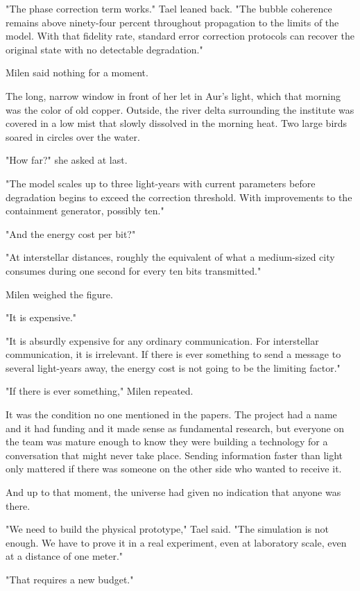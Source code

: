 \documentclass[11pt,a5paper,twoside]{book}
\begin{document}
"The phase correction term works." Tael leaned back. "The bubble coherence remains above ninety-four percent throughout propagation to the limits of the model. With that fidelity rate, standard error correction protocols can recover the original state with no detectable degradation."

Milen said nothing for a moment.

The long, narrow window in front of her let in Aur’s light, which that morning was the color of old copper. Outside, the river delta surrounding the institute was covered in a low mist that slowly dissolved in the morning heat. Two large birds soared in circles over the water.

"How far?" she asked at last.

"The model scales up to three light-years with current parameters before degradation begins to exceed the correction threshold. With improvements to the containment generator, possibly ten."

"And the energy cost per bit?"

"At interstellar distances, roughly the equivalent of what a medium-sized city consumes during one second for every ten bits transmitted."

Milen weighed the figure.

"It is expensive."

"It is absurdly expensive for any ordinary communication. For interstellar communication, it is irrelevant. If there is ever something to send a message to several light-years away, the energy cost is not going to be the limiting factor."

"If there is ever something," Milen repeated.

It was the condition no one mentioned in the papers. The project had a name and it had funding and it made sense as fundamental research, but everyone on the team was mature enough to know they were building a technology for a conversation that might never take place. Sending information faster than light only mattered if there was someone on the other side who wanted to receive it.

And up to that moment, the universe had given no indication that anyone was there.

"We need to build the physical prototype," Tael said. "The simulation is not enough. We have to prove it in a real experiment, even at laboratory scale, even at a distance of one meter."

"That requires a new budget."
\end{document}
